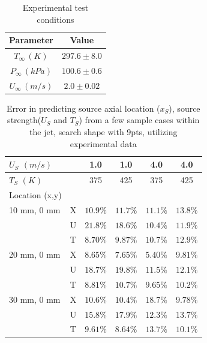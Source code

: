 \documentclass[preprint,12pt]{elsarticle}
\begin{document}
%
%
\begin{table}[!t!b!p]
\begin{center}
\begin{tabular}{ c c }
\hline
Parameter    & Value \\ \hline
$T_{\infty} \, (K) $ & $297.6\pm8.0$ \\
$P_{\infty} \, (kPa) $ & $100.6\pm0.6$ \\ 
$U_{\infty} \, (m/s) $ & $2.0\pm0.02$ \\ \hline
\end{tabular}
\caption{Experimental test conditions}
\label{tab:ETjet}
\end{center}
\end{table}
%
\begin{table}[!h!t!b!p]
\begin{center}
\begin{tabular}{ l | l c c c c}
\hline
 $U_{S}$ $(m/s)$ & & 1.0 & 1.0 & 4.0 & 4.0 \\ \hline
 $T_S$ $(K)$ & & 375 & 425 & 375 & 425  \\ \hline \hline
 Location (x,y) & \\
 10 mm, 0 mm & X & $10.9\%$ & $11.7\%$ & $11.1\%$ & $13.8\%$ \\
 			 & U & $21.8\%$ & $18.6\%$ & $10.4\%$ & $11.9\%$ \\
 			 & T & $8.70\%$ & $9.87\%$ & $10.7\%$ & $12.9\%$ \\ \hline
 20 mm, 0 mm & X & $8.65\%$ & $7.65\%$ & $5.40\%$ & $9.81\%$ \\
 			 & U & $18.7\%$ & $19.8\%$ & $11.5\%$ & $12.1\%$ \\
 			 & T & $8.81\%$ & $10.7\%$ & $9.65\%$ & $10.2\%$ \\ \hline
 30 mm, 0 mm & X & $10.6\%$ & $10.4\%$ & $18.7\%$ & $9.78\%$ \\
 			 & U & $15.8\%$ & $17.9\%$ & $12.3\%$ & $13.7\%$ \\
 			 & T & $9.61\%$ & $8.64\%$ & $13.7\%$ & $10.1\%$ \\ \hline			 
 \end{tabular}
\caption{Error in predicting source axial location ($x_S$), source strength($U_S$ and $T_S$) from a few sample cases within the jet, search shape with 9pts, utilizing experimental data\cite{vanderveer}}
\label{tab:typejetF}
\end{center}
\end{table}
\end{document}

